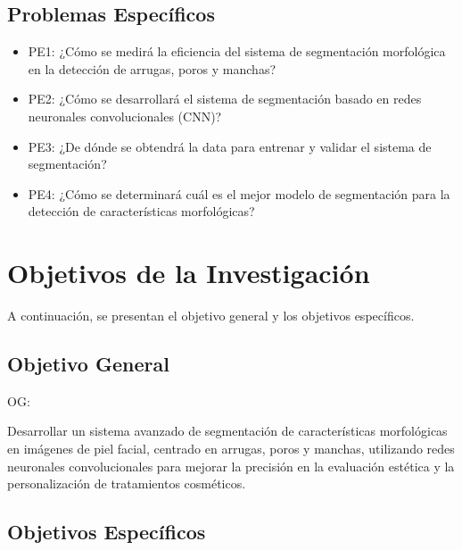 \subsection{Problemas Específicos}
\newcommand{\Pbone}{
¿Cómo se medirá la eficiencia del sistema de segmentación morfológica en la detección de arrugas, poros y manchas?
}
\newcommand{\Pbtwo}{
¿Cómo se desarrollará el sistema de segmentación basado en redes neuronales convolucionales (CNN)?
}
\newcommand{\Pbthree}{
¿De dónde se obtendrá la data para entrenar y validar el sistema de segmentación?
}

\newcommand{\Pbfour}{
¿Cómo se determinará cuál es el mejor modelo de segmentación para la detección de características morfológicas?
}

\begin{itemize}
	\item PE1: {\Pbone}
	\item PE2: {\Pbtwo}
	\item PE3: {\Pbthree}
	\item PE4: {\Pbfour}
\end{itemize}

\section{Objetivos de la Investigación}
A continuación, se presentan el objetivo general y los objetivos específicos.
\subsection{Objetivo General}
OG: \newcommand{\ObjetivoGeneral}{
	Desarrollar un sistema avanzado de segmentación de características morfológicas en imágenes de piel facial, centrado en arrugas, poros y manchas, utilizando redes neuronales convolucionales para mejorar la precisión en la evaluación estética y la personalización de tratamientos cosméticos.
}
\ObjetivoGeneral
\subsection{Objetivos Específicos}
\newcommand{\Objone}{
Desarrollar métricas de evaluación como precisión, recall, F1-score y AUC-ROC para medir la eficiencia del sistema de segmentación en la identificación de características morfológicas de la piel facial.
}

\newcommand{\Objtwo}{
Desarrollar e implementar un sistema de segmentación utilizando redes neuronales convolucionales, adaptando sus arquitecturas para la detección y diferenciación de características morfológicas de la piel como arrugas, poros y manchas.
}

